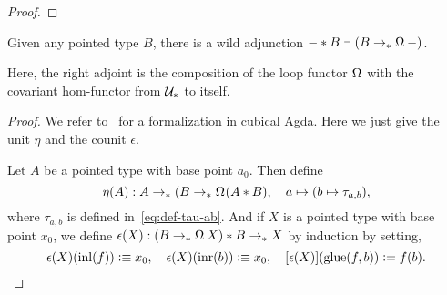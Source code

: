 \documentclass[english,a4paper]{lmcs}
\begin{document}
\begin{proof}
\end{proof}

\begin{prop}
  Given any pointed type $B$, there is a wild adjunction
  ${\blank}*B \leftadjto (B \ptdto \loopspace\null\blank)$.
  \label{prop:join-loop-adjunction}
\end{prop}
\noindent Here, the right adjoint is the composition
of the loop functor $\loopspace\null$
with the covariant hom-functor from $\mathcal{U}_*$ to itself.
\begin{proof}
  We refer to~\cite{joinloopadj} for a formalization in cubical Agda.
  Here we just give the unit $\eta$ and the counit $\epsilon$.

  Let $A$ be a pointed type with base point $a_0$. Then define
  \[
    \eta(A) : A \ptdto (B \ptdto \loopspace\null(A * B),\quad
    a \mapsto (b \mapsto \tau_{a,b}),
  \]
  where $\tau_{a,b}$ is defined in~\eqref{eq:def-tau-ab}.
  And if $X$ is a pointed type with base point $x_0$, we define
  $\epsilon(X) : (B \ptdto \loopspace\null X) * B \ptdto X$
  by induction by setting,
  \[
    \epsilon(X)(\mathop{\mathrm{inl}}(f)) \vcentcolon\equiv x_0,\quad
    \epsilon(X)(\mathop{\mathrm{inr}}(b)) \vcentcolon\equiv x_0,\quad
    \mathop{\left[{\epsilon(X)}\right]}(\operatorname{\mathrm{glue}}(f,b)) \vcentcolon= f(b).\qedhere
  \]
\end{proof}
\end{document}

